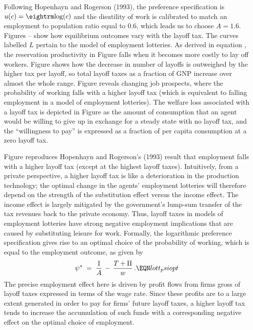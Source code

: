 Following Hopenhayn and Rogerson (1993), the preference specification
is $u(c) = \hbox{\rm log}(c)$ and the disutility of work is calibrated
to match an employment to population ratio equal to $0.6$, which leads
us to choose $A=1.6$. Figures -- %
show how equilibrium
outcomes vary with the layoff tax. The curves labelled $L$ pertain to
the model of employment lotteries. As derived in equation
, the reservation
productivity in Figure  %
  falls when it becomes more costly to lay
off workers. Figure  %
 shows how the decrease in number of layoffs
is outweighed by the higher tax per layoff, so total layoff taxes
as a fraction of GNP increase over almost the whole range.
Figure  %
 reveals changing job prospects, where the probability
of working falls with a higher layoff tax (which is  equivalent
to falling employment in a model of employment lotteries).
The welfare loss associated with a layoff tax is depicted in
Figure  %
as the amount of consumption that an agent would be
willing to give up in exchange for a steady state
with no layoff tax,            %
and the ``willingness to pay'' is expressed as a fraction of per
capita consumption at a zero layoff tax.



Figure  %
reproduces Hopenhayn and Rogerson's (1993) result
that employment falls with a higher layoff tax (except at the
highest layoff taxes). Intuitively, from a private perspective,
a higher layoff tax
is like a deterioration in
the production technology; the optimal change in the agents'
employment lotteries will therefore depend on the strength of
the substitution effect versus the income effect. The income
effect is largely mitigated by the government's lump-sum transfer
of the tax revenues back  to the private economy. Thus,
layoff taxes in models of employment lotteries have strong
negative employment implications that are caused by substituting
leisure for work. Formally, the
logarithmic preference specification gives rise to an optimal
choice of the probability of working, which is equal to
the employment outcome, as given by
$$
\psi^* \;=\; {1 \over A} \,-\, {T + \Pi \over w} \,. \EQN lott_psiopt
$$
The precise employment effect here is driven by profit flows
from firms gross of layoff taxes expressed in terms of
the wage rate. Since these profits are to a large extent
generated in order to pay for firms' future layoff taxes, a
higher layoff tax tends to increase the accumulation of such
funds with a corresponding negative effect on the optimal
choice of employment.


